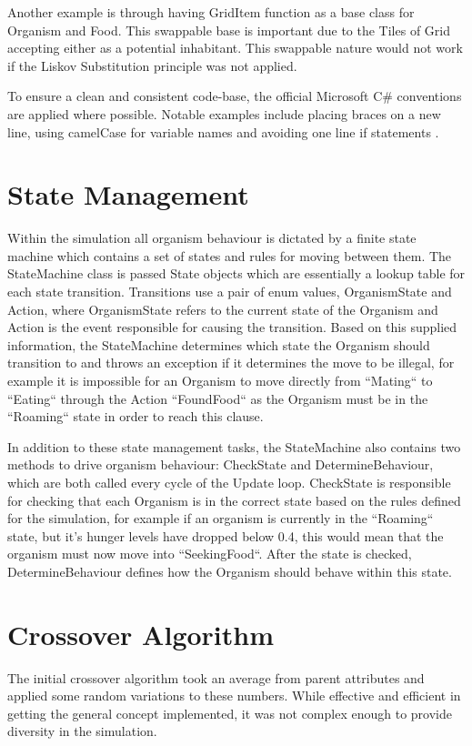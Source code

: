 \documentclass[a4paper, oneside, 11pt]{report}
\begin{document}
Another example is through having GridItem function as a base class for Organism and Food. This swappable base is important due to the Tiles of Grid accepting either as a potential inhabitant. This swappable nature would not work if the Liskov Substitution principle was not applied.

To ensure a clean and consistent code-base, the official Microsoft C\# conventions are applied where possible. Notable examples include placing braces on a new line, using camelCase for variable names and avoiding one line if statements \cite{microsoft}.

\section{State Management}\label{statemanagement}
Within the simulation all organism behaviour is dictated by a finite state machine which contains a set of states and rules for moving between them. The StateMachine class is passed State objects which are essentially a lookup table for each state transition. Transitions use a pair of enum values, OrganismState and Action, where OrganismState refers to the current state of the Organism and Action is the event responsible for causing the transition. Based on this supplied information, the StateMachine determines which state the Organism should transition to and throws an exception if it determines the move to be illegal, for example it is impossible for an Organism to move directly from ``Mating`` to ``Eating`` through the Action ``FoundFood`` as the Organism must be in the ``Roaming`` state in order to reach this clause.

In addition to these state management tasks, the StateMachine also contains two methods to drive organism behaviour: CheckState and DetermineBehaviour, which are both called every cycle of the Update loop. CheckState is responsible for checking that each Organism is in the correct state based on the rules defined for the simulation, for example if an organism is currently in the ``Roaming`` state, but it's hunger levels have dropped below 0.4, this would mean that the organism must now move into ``SeekingFood``. After the state is checked, DetermineBehaviour defines how the Organism should behave within this state.

\section{Crossover Algorithm}\label{crossover}
The initial crossover algorithm took an average from parent attributes and applied some random variations to these numbers. While effective and efficient in getting the general concept implemented, it was not complex enough to provide diversity in the simulation.
\end{document}
